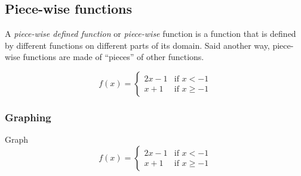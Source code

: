 \subsection{Piece-wise functions}

\begin{definition}\label{def: piecewise function}
A \emph{piece-wise defined function} or \emph{piece-wise} function
is a function that is defined by different functions on different
parts of its domain. Said another way, piece-wise functions are made
of ``pieces'' of other functions.
\end{definition}

\begin{example}
\[
f(x)=
\begin{cases}
2x-1 & \text{if }x<-1\\
x+1 & \text{if }x\geq-1
\end{cases}
\]
\end{example}

\newpage

\subsubsection*{Graphing}

\begin{exercise}
Graph
\[
f(x)=
\begin{cases}
2x-1 & \text{if }x<-1\\
x+1 & \text{if }x\geq-1
\end{cases}
\]
\end{exercise}
\ifprintanswers
\else
\begin{center}
\end{center}
\fi
\begin{solution}[1in]

\end{solution}

